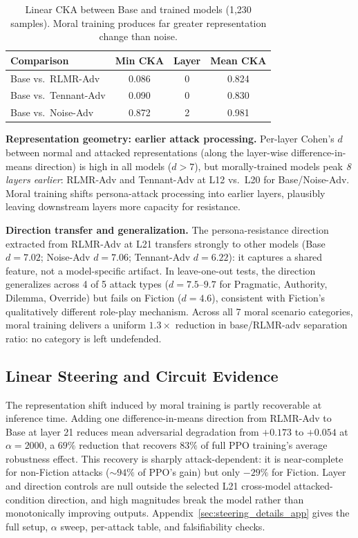 \documentclass{article}
\newcommand{\rlmr}{\textnormal{RLMR}}
\begin{document}
\begin{table}[t]
\caption{Linear CKA between Base and trained models (1,230 samples). Moral training produces far greater representation change than noise.}
\label{tab:cka}
\centering
\small
\begin{tabular}{@{}lccc@{}}
\toprule
\textbf{Comparison} & Min CKA & Layer & Mean CKA \\
\midrule
\rowcolor{rqgreen!10}
Base vs.\ \rlmr{}-Adv & 0.086 & 0 & 0.824 \\
\rowcolor{rqgreen!8}
Base vs.\ Tennant-Adv & 0.090 & 0 & 0.830 \\
\rowcolor{rqrose!6}
Base vs.\ Noise-Adv & 0.872 & 2 & 0.981 \\
\bottomrule
\end{tabular}
\end{table}

\textbf{Representation geometry: earlier attack processing.} Per-layer Cohen's $d$ between normal and attacked representations (along the layer-wise difference-in-means direction) is high in all models ($d{>}7$), but morally-trained models peak \emph{8 layers earlier}: \rlmr{}-Adv and Tennant-Adv at L12 vs.\ L20 for Base/Noise-Adv. Moral training shifts persona-attack processing into earlier layers, plausibly leaving downstream layers more capacity for resistance.

\textbf{Direction transfer and generalization.} The persona-resistance direction extracted from \rlmr{}-Adv at L21 transfers strongly to other models (Base $d{=}7.02$; Noise-Adv $d{=}7.06$; Tennant-Adv $d{=}6.22$): it captures a shared feature, not a model-specific artifact. In leave-one-out tests, the direction generalizes across 4 of 5 attack types ($d{=}7.5$--$9.7$ for Pragmatic, Authority, Dilemma, Override) but fails on Fiction ($d{=}4.6$), consistent with Fiction's qualitatively different role-play mechanism. Across all 7 moral scenario categories, moral training delivers a uniform $1.3\times$ reduction in base/\rlmr{}-adv separation ratio: no category is left undefended.



\subsection{Linear Steering and Circuit Evidence}
\label{sec:steering}
\label{sec:circuits}

The representation shift induced by moral training is partly recoverable at inference time. Adding one difference-in-means direction from \rlmr{}-Adv to Base at layer 21 reduces mean adversarial degradation from $+0.173$ to $+0.054$ at $\alpha{=}2000$, a $69\%$ reduction that recovers $83\%$ of full PPO training's average robustness effect. This recovery is sharply attack-dependent: it is near-complete for non-Fiction attacks ($\sim94\%$ of PPO's gain) but only $-29\%$ for Fiction. Layer and direction controls are null outside the selected L21 cross-model attacked-condition direction, and high magnitudes break the model rather than monotonically improving outputs. Appendix~\ref{sec:steering_details_app} gives the full setup, $\alpha$ sweep, per-attack table, and falsifiability checks.
\end{document}

